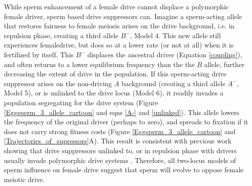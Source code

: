 \documentclass[12pt,letterpaper]{article}
\newcommand{\gc}[1]{{ \color{red} #1}}
\newcommand{\yb}[1]{{ \color{blue} #1}}
\begin{document}
While  sperm enhancement of a female drive cannot displace a polymorphic female driver, sperm based drive suppressors can. 
\gc{Imagine a sperm-acting allele that restores fairness to female meiosis arises on
	the drive background, i.e. in repulsion phase, creating a
        third allele $B^{-}$, Model 4. This new allele still
        experiences femaledrive, but does so at a lower rate (or not
        at all) when it
        is fertilized by itself.} This $B^{-}$ displaces the ancestral driver (Equation \ref{coupling}), 
	and often returns to a lower equilibrium frequency than the the $B$ allele, further decreasing the extent of drive in the population.  
If this sperm-acting drive suppressor arises on 
	the non-driving $A$ background (creating a third allele $A^{-}$, Model 5), 
	or is unlinked to the drive locus (Model 6), it readily invades a population segregating
	for the drive system (Figure \ref{Eggsperm_3_allele_cartoon} and eqns \ref{A-} and \ref{unlinked}).  
This allele lowers the frequency of the original driver (perhaps to zero),
	and spreads to fixation if it does not carry strong fitness costs
	(Figure \ref{Eggsperm_3_allele_cartoon} and \ref{Trajectories_of_supressors}A). 
This result is consistent with previous work showing that drive suppressors unlinked to, or in repulsion phase with drivers usually invade polymorphic drive systems \citep[e.g. ][]{Brandvain2012}.  
Therefore, all two-locus models of sperm influence on female drive suggest that
	sperm will evolve to oppose female meiotic drive.


\end{document}
